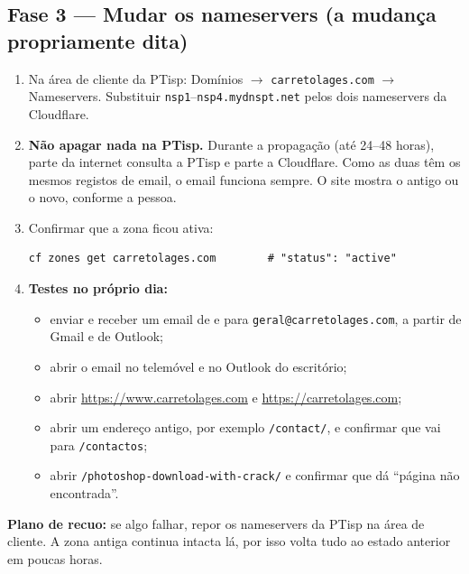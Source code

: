 \documentclass[11pt,a4paper]{article}
\begin{document}
\subsection{Fase 3 --- Mudar os nameservers (a mudança propriamente dita)}
\begin{enumerate}
  \item Na área de cliente da PTisp: Domínios $\rightarrow$ \texttt{carretolages.com} $\rightarrow$
        Nameservers. Substituir \texttt{nsp1}--\texttt{nsp4.mydnspt.net} pelos dois nameservers da
        Cloudflare.
  \item \textbf{Não apagar nada na PTisp.} Durante a propagação (até 24--48 horas), parte da internet
        consulta a PTisp e parte a Cloudflare. Como as duas têm os mesmos registos de email, o email
        funciona sempre. O site mostra o antigo ou o novo, conforme a pessoa.
  \item Confirmar que a zona ficou ativa:
\begin{verbatim}
cf zones get carretolages.com        # "status": "active"
\end{verbatim}
  \item \textbf{Testes no próprio dia:}
        \begin{itemize}
          \item enviar e receber um email de e para \texttt{geral@carretolages.com}, a partir de Gmail e
                de Outlook;
          \item abrir o email no telemóvel e no Outlook do escritório;
          \item abrir \url{https://www.carretolages.com} e \url{https://carretolages.com};
          \item abrir um endereço antigo, por exemplo \texttt{/contact/}, e confirmar que vai para
                \texttt{/contactos};
          \item abrir \texttt{/photoshop-download-with-crack/} e confirmar que dá ``página não
                encontrada''.
        \end{itemize}
\end{enumerate}

\textbf{Plano de recuo:} se algo falhar, repor os nameservers da PTisp na área de cliente. A zona antiga
continua intacta lá, por isso volta tudo ao estado anterior em poucas horas.
\end{document}
